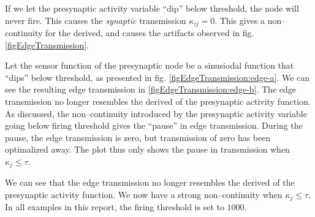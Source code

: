 			If we let the presynaptic activity variable ``dip'' below threshold, the node will never fire.
			This causes the \emph{synaptic} transmission $\kappa_{ij} = 0$.
			This gives a non--continuity for the derived, and causes the artifacts observed in fig. \ref{figEdgeTransmission}. 


			Let the sensor function of the presynaptic node be a sinusiodal function that ``dips'' below threshold, as presented in fig. \ref{figEdgeTransmission:edge-a}.
			We can see the resulting edge transmission in \ref{figEdgeTransmission:edge-b}.
			The edge transmission no longer resembles the derived of the presynaptic activity function.
			As discussed, the non--continuity introduced by the presynaptic activity variable going below firing threshold gives the ``pause'' in edge transmission.
			During the pause, the edge transmission is zero, but transmission of zero has been optimalized away.
			The plot thus only shows the pause in transmission when $\kappa_j \leq \tau$.


			We can see that the edge transmission no longer resembles the derived of the presynaptic activity function. 
			We now have a strong non--continuity when $\kappa_j \leq \tau$.
			In all examples in this report, the firing threshold is set to $1000$.











